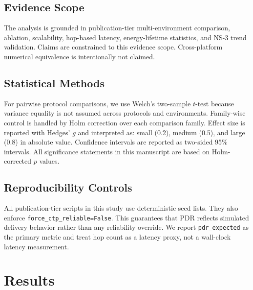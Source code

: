 ﻿\documentclass[sensors,article,submit,moreauthors,pdftex]{Definitions/mdpi}
\begin{document}
\subsection{Evidence Scope}
The analysis is grounded in publication-tier multi-environment comparison, ablation, scalability, hop-based latency, energy-lifetime statistics, and NS-3 trend validation. Claims are constrained to this evidence scope. Cross-platform numerical equivalence is intentionally not claimed.

\subsection{Statistical Methods}
For pairwise protocol comparisons, we use Welch's two-sample $t$-test because variance equality is not assumed across protocols and environments. Family-wise control is handled by Holm correction over each comparison family. Effect size is reported with Hedges' $g$ and interpreted as: small (0.2), medium (0.5), and large (0.8) in absolute value. Confidence intervals are reported as two-sided 95\% intervals. All significance statements in this manuscript are based on Holm-corrected $p$ values.

\subsection{Reproducibility Controls}
All publication-tier scripts in this study use deterministic seed lists. They also enforce \texttt{force\_ctp\_reliable=False}. This guarantees that PDR reflects simulated delivery behavior rather than any reliability override. We report \texttt{pdr\_expected} as the primary metric and treat hop count as a latency proxy, not a wall-clock latency measurement.

\section{Results}
\end{document}
